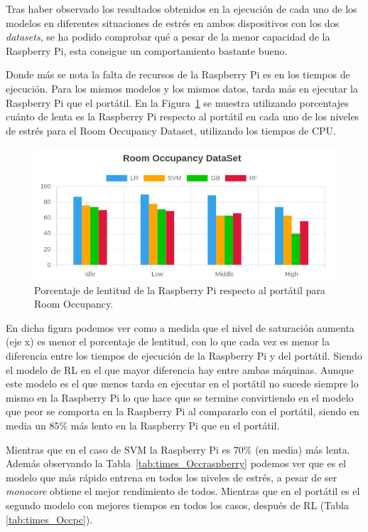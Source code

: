 \documentclass[a4paper, 12pt]{book}
\begin{document}
Tras haber observado los resultados obtenidos en la ejecución de cada uno de los modelos en diferentes situaciones de estrés en ambos dispositivos con los dos \textit{datasets}, se ha podido comprobar qué a pesar de la menor capacidad de la Raspberry Pi, esta consigue un comportamiento bastante bueno.

Donde más se nota la falta de recursos de la Raspberry Pi es en los tiempos de ejecución. Para los mismos modelos y los mismos datos, tarda más en ejecutar la Raspberry Pi que el portátil. En la Figura~\ref{fig:per_occupancy} se muestra utilizando porcentajes cuánto de lenta es la Raspberry Pi respecto al portátil en cada uno de los niveles de estrés para el Room Occupancy Dataset, utilizando los tiempos de CPU.

\begin{figure}[htb]
  \centering
  \includegraphics[width=14cm, keepaspectratio]{img/per_occupancy.png}
  \caption{Porcentaje de lentitud de la Raspberry Pi respecto al portátil para Room Occupancy.}
  \label{fig:per_occupancy}
\end{figure}

En dicha figura podemos ver como a medida que el nivel de saturación aumenta (eje x) es menor el porcentaje de lentitud, con lo que cada vez es menor la diferencia entre los tiempos de ejecución de la Raspberry Pi y del portátil. Siendo el modelo de RL en el que mayor diferencia hay entre ambas máquinas. Aunque este modelo es el que menos tarda en ejecutar en el portátil no sucede siempre lo mismo en la Raspberry Pi lo que hace que se termine convirtiendo en el modelo que peor se comporta en la Raspberry Pi al compararlo con el portátil, siendo en media un $85\%$ más lento en la Raspberry Pi que en el portátil.

Mientras que en el caso de SVM la Raspberry Pi es $70\%$ (en media) más lenta. Además observando la Tabla~\ref{tab:times_Occraspberry} podemos ver que es el modelo que más rápido entrena en todos los niveles de estrés, a pesar de ser \textit{monocore} obtiene el mejor rendimiento de todos. Mientras que en el portátil es el segundo modelo con mejores tiempos en todos los casos, después de RL (Tabla \ref{tab:times_Occpc}).
\end{document}

